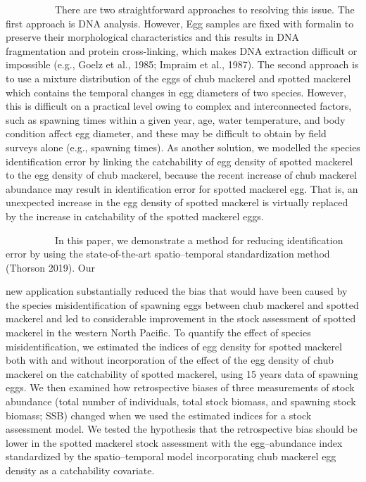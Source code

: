 \documentclass[12pt]{article}
\begin{document}
\begin{linenumbers}
\ \ \ \ \ \ \ \ \ \
There are two straightforward approaches to resolving this issue. The first approach is DNA analysis. However, Egg samples are fixed with formalin to preserve their morphological characteristics and this results in DNA fragmentation and protein cross-linking, which makes DNA extraction difficult or impossible (e.g., Goelz et al., 1985; Impraim et al., 1987). The second approach is to use a mixture distribution of the eggs of chub mackerel and spotted mackerel which contains the temporal changes in egg diameters of two species. However, this is difficult on a practical level owing to complex and interconnected factors, such as spawning times within a given year, age, water temperature, and body condition affect egg diameter, and these may be difficult to obtain by field surveys alone (e.g., spawning times). As another solution, we modelled the species identification error by linking the catchability of egg density of spotted mackerel to the egg density of chub mackerel, because the recent increase of chub mackerel abundance may result in identification error for spotted mackerel egg. That is, an unexpected increase in the egg density of spotted mackerel is virtually replaced by the increase in catchability of the spotted mackerel eggs.

\ \ \ \ \ \ \ \ \ \
In this paper, we demonstrate a method for reducing identification error by using the state-of-the-art spatio--temporal standardization method (Thorson 2019). Our {new application substantially reduced the bias that would have been caused by the species misidentification of spawning eggs between chub mackerel and spotted mackerel and led to considerable improvement in the stock assessment of spotted mackerel in the western North Pacific. To quantify the effect of species misidentification, we estimated the indices of egg density for spotted mackerel both with and without incorporation of the effect of the egg density of chub mackerel on the catchability of spotted mackerel, using 15 years data of spawning eggs. We then examined how retrospective biases of three measurements of stock abundance (total number of individuals, total stock biomass, and spawning stock biomass; SSB) changed when we used the estimated indices for a stock assessment model. We tested the hypothesis that the retrospective bias should be lower in the spotted mackerel stock assessment with the egg--abundance index standardized by the spatio--temporal model incorporating chub mackerel egg density as a catchability covariate.

\ \\

}
\end{linenumbers}
\end{document}
